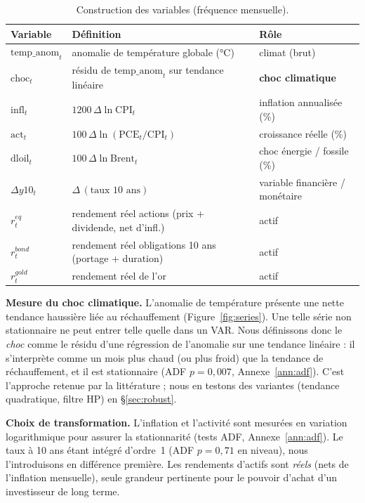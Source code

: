 \documentclass[11pt,a4paper]{article}
\begin{document}
\begin{table}[H]
\centering\small
\caption{Construction des variables (fréquence mensuelle).}
\label{tab:vars}
\begin{tabular}{lll}
\toprule
Variable & Définition & Rôle \\
\midrule
$\mathrm{temp\_anom}_t$ & anomalie de température globale (°C) & climat (brut) \\
$\mathrm{choc}_t$ & résidu de $\mathrm{temp\_anom}_t$ sur tendance linéaire & \textbf{choc climatique} \\
$\mathrm{infl}_t$ & $1200\,\Delta\ln \mathrm{CPI}_t$ & inflation annualisée (\%) \\
$\mathrm{act}_t$ & $100\,\Delta\ln(\mathrm{PCE}_t/\mathrm{CPI}_t)$ & croissance réelle (\%) \\
$\mathrm{dloil}_t$ & $100\,\Delta\ln \mathrm{Brent}_t$ & choc énergie / fossile (\%) \\
$\Delta y10_t$ & $\Delta\,(\text{taux 10 ans})$ & variable financière / monétaire \\
$r^{eq}_t$ & rendement réel actions (prix + dividende, net d'infl.) & actif \\
$r^{bond}_t$ & rendement réel obligations 10 ans (portage + duration) & actif \\
$r^{gold}_t$ & rendement réel de l'or & actif \\
\bottomrule
\end{tabular}
\end{table}

\textbf{Mesure du choc climatique.} L'anomalie de température présente une nette tendance
haussière liée au réchauffement (Figure~\ref{fig:series}). Une telle série non stationnaire ne peut
entrer telle quelle dans un VAR. Nous définissons donc le \emph{choc} comme le résidu d'une
régression de l'anomalie sur une tendance linéaire : il s'interprète comme un mois
plus chaud (ou plus froid) que la tendance de réchauffement, et il est stationnaire
(ADF $p=0{,}007$, Annexe~\ref{ann:adf}). C'est l'approche retenue par la littérature
\citep{faccia2021,kotz2024} ; nous en testons des variantes (tendance quadratique, filtre
HP) en \S\ref{sec:robust}.

\textbf{Choix de transformation.} L'inflation et l'activité sont mesurées en variation
logarithmique pour assurer la stationnarité (tests ADF, Annexe~\ref{ann:adf}). Le taux à 10
ans étant intégré d'ordre~1 (ADF $p=0{,}71$ en niveau), nous l'introduisons en différence
première. Les rendements d'actifs sont \emph{réels} (nets de l'inflation mensuelle), seule
grandeur pertinente pour le pouvoir d'achat d'un investisseur de long terme.
\end{document}
